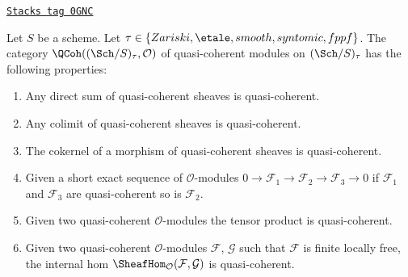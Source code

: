 \begin{lemma}
\label{descent-lemma-properties-quasi-coherent-on-big}
\href{https://stacks.math.columbia.edu/tag/0GNC}{\texttt{Stacks tag 0GNC}}

Let $S$ be a scheme.
Let $\tau \in \{Zariski, \linebreak[0] \etale, \linebreak[0]
smooth, \linebreak[0] syntomic, \linebreak[0] fppf\}$.
The category $\QCoh((\Sch/S)_\tau, \mathcal{O})$
of quasi-coherent modules on $(\Sch/S)_\tau$
has the following properties:
\begin{enumerate}
\item Any direct sum of quasi-coherent sheaves is quasi-coherent.
\item Any colimit of quasi-coherent sheaves is quasi-coherent.
\item The cokernel of a morphism of quasi-coherent sheaves
is quasi-coherent.
\item Given a short exact sequence of $\mathcal{O}$-modules
$0 \to \mathcal{F}_1 \to \mathcal{F}_2 \to \mathcal{F}_3 \to 0$
if $\mathcal{F}_1$ and $\mathcal{F}_3$ are quasi-coherent so is
$\mathcal{F}_2$.
\item Given two quasi-coherent $\mathcal{O}$-modules
the tensor product is quasi-coherent.
\item Given two quasi-coherent $\mathcal{O}$-modules
$\mathcal{F}$, $\mathcal{G}$ such that $\mathcal{F}$
is finite locally free, the internal hom
$\SheafHom_\mathcal{O}(\mathcal{F}, \mathcal{G})$
is quasi-coherent.
\end{enumerate}
\end{lemma}

